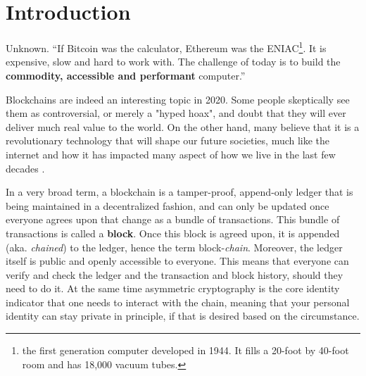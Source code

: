 \chapter{Introduction} \label{chap:intoroduction}

\ifpdf
    \graphicspath{{1_introduction/figures/PNG/}{1_introduction/figures/PDF/}{1_introduction/figures/}}
\else
    \graphicspath{{1_introduction/figures/EPS/}{1_introduction/figures/}}
\fi

\begin{chapquote}{Unknown.}
``If Bitcoin was the calculator, Ethereum was the ENIAC\footnote{the first generation computer
developed in 1944. It fills a 20-foot by 40-foot room and has 18,000 vacuum tubes.}. It is
expensive, slow and hard to work with. The challenge of today is to build the \textbf{commodity,
accessible and performant} computer.''
\end{chapquote}



Blockchains are indeed an interesting topic in 2020. Some people skeptically see them as
controversial, or merely a "hyped hoax", and doubt that they will ever deliver much real value to
the world. On the other hand, many believe that it is a revolutionary technology that will shape our
future societies, much like the internet and how it has impacted many aspect of how we live in the
last few decades \cite{will_blockchain_be_big_deal}.

In a very broad term, a blockchain is a tamper-proof, append-only ledger that is being maintained in
a decentralized fashion, and can only be updated once everyone agrees upon that change as a bundle
of transactions. This bundle of transactions is called a \textbf{block}. Once this block is agreed
upon, it is appended (aka. \textit{chained}) to the ledger, hence the term block-\textit{chain}.
Moreover, the ledger itself is public and openly accessible to everyone. This means that everyone
can verify and check the ledger and the transaction and block history, should they need to do it. At
the same time asymmetric cryptography is the core identity indicator that one needs to interact with
the chain, meaning that your personal identity can stay private in principle, if that is desired
based on the circumstance.

